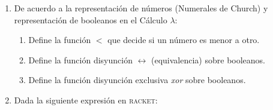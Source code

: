 \documentclass[letterpaper,11pt]{article}
\begin{document}
\begin{enumerate}
    \newpage
    \item De acuerdo a la representación de números (Numerales de Church) y 
    representación de booleanos en el Cálculo $\lambda$:
    \begin{enumerate}
        \item Define la función $<$ que decide si un número es menor a otro.

        \item Define la función disyunción $\leftrightarrow$ (equivalencia) 
        sobre booleanos.

        \item Define la función disyunción exclusiva \textit{xor} sobre 
        booleanos.
    \end{enumerate}

    \item Dada la siguiente expresión en \textsc{racket}:
\end{enumerate}
\end{document}

